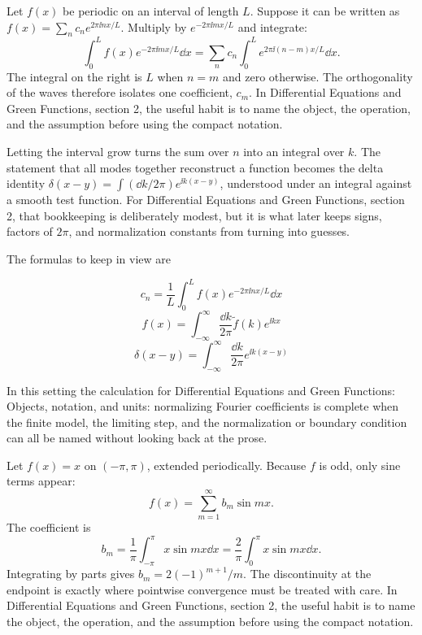 Let \(f(x)\) be periodic on an interval of length \(L\).  Suppose it can be written as \(f(x)=\sum_n c_ne^{2\pi\ii nx/L}\).  Multiply by \(e^{-2\pi\ii mx/L}\) and integrate:
\[
  \int_0^L f(x)e^{-2\pi\ii mx/L}\dd x
  =
  \sum_n c_n\int_0^L e^{2\pi\ii(n-m)x/L}\dd x.
\]
The integral on the right is \(L\) when \(n=m\) and zero otherwise.  The orthogonality of the waves therefore isolates one coefficient, \(c_m\).  In Differential Equations and Green Functions, section 2, the useful habit is to name the object, the operation, and the assumption before using the compact notation.

Letting the interval grow turns the sum over \(n\) into an integral over \(k\).  The statement that all modes together reconstruct a function becomes the delta identity \(\delta(x-y)=\int(\dd k/2\pi)e^{\ii k(x-y)}\), understood under an integral against a smooth test function.  For Differential Equations and Green Functions, section 2, that bookkeeping is deliberately modest, but it is what later keeps signs, factors of \(2\pi\), and normalization constants from turning into guesses.

The formulas to keep in view are

\[
  c_n=\frac1L\int_0^L f(x)e^{-2\pi\ii nx/L}\dd x
\]
\[
  f(x)=\int_{-\infty}^{\infty}\frac{\dd k}{2\pi}\tilde f(k)e^{\ii kx}
\]
\[
  \delta(x-y)=\int_{-\infty}^{\infty}\frac{\dd k}{2\pi}e^{\ii k(x-y)}
\]

In this setting the calculation for Differential Equations and Green Functions: Objects, notation, and units: normalizing Fourier coefficients is complete when the finite model, the limiting step, and the normalization or boundary condition can all be named without looking back at the prose.




\begin{example}
Let \(f(x)=x\) on \((-\pi,\pi)\), extended periodically.  Because \(f\) is odd, only sine terms appear:
\[
  f(x)=\sum_{m=1}^\infty b_m\sin mx.
\]
The coefficient is
\[
  b_m=\frac1\pi\int_{-\pi}^\pi x\sin mx\dd x
  =\frac2\pi\int_0^\pi x\sin mx\dd x.
\]
Integrating by parts gives \(b_m=2(-1)^{m+1}/m\).  The discontinuity at the endpoint is exactly where pointwise convergence must be treated with care.  In Differential Equations and Green Functions, section 2, the useful habit is to name the object, the operation, and the assumption before using the compact notation.
\end{example}



